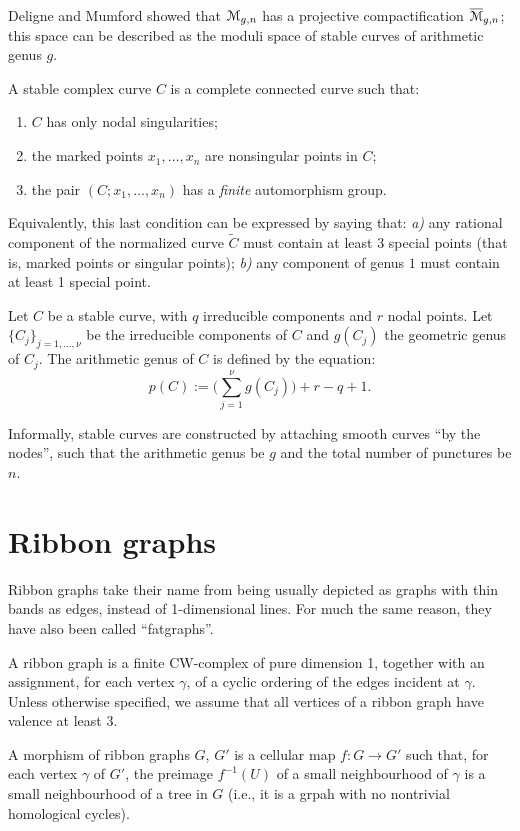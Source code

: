 Deligne and Mumford \cite{deligne-mumford} showed that $\mathcal{M}_{g,n}$ has
a projective compactification $\overline{\mathcal{M}}_{g,n}$; this space can be
described as the moduli space of stable curves of arithmetic genus
$g$.
\begin{definition}
  A stable complex curve $C$ is a complete connected curve such that:
  \begin{enumerate}
  \item $C$ has only nodal singularities;
  \item the marked points $x_1, \ldots, x_n$ are nonsingular points in
    $C$;
  \item the pair $(C; x_1, \ldots, x_n)$ has a \emph{finite} automorphism
    group.
  \end{enumerate}
\end{definition}
Equivalently, this last condition can be expressed by saying that:
\textsl{a)} any rational component of the normalized curve $\tilde C$
must contain at least 3 special points (that is, marked points or
singular points); \textsl{b)} any component of genus $1$ must contain
at least 1 special point.

Let $C$ be a stable curve, with $q$ irreducible components and $r$
nodal points. Let $\{C_j\}_{j=1, \dots, \nu}$ be the irreducible
components of $C$ and $g(C_j)$ the geometric genus of $C_j$.  The
arithmetic genus of $C$ is defined by the equation:
\begin{equation*}
  p(C) := \bigl({\textstyle \sum_{j=1}^\nu} g(C_j) \bigr) + r - q + 1.
\end{equation*}

Informally, stable curves are constructed by attaching smooth curves
``by the nodes'', such that the arithmetic genus be $g$ and the total
number of punctures be $n$.



\section{Ribbon graphs}
\label{sec:ribbon-graphs}

Ribbon graphs take their name from being usually depicted as graphs
with thin bands as edges, instead of 1-dimensional lines.  For much
the same reason, they have also been called ``fatgraphs''.

\begin{definition}
  \label{dfn:ribbon-graphs}
  A ribbon graph is a finite CW-complex of pure dimension 1, together
  with an assignment, for each vertex $\gamma$, of a cyclic ordering of the
  edges incident at $\gamma$.  Unless otherwise specified, we assume that
  all vertices of a ribbon graph have valence at least 3.

  A morphism of ribbon graphs $G$, $G'$ is a cellular map $f:G\to G'$
  such that, for each vertex $\gamma$ of $G'$, the preimage $f^{-1}(U)$ of
  a small neighbourhood of $\gamma$ is a small neighbourhood of a tree in
  $G$ (i.e., it is a grpah with no nontrivial homological cycles).
\end{definition}

